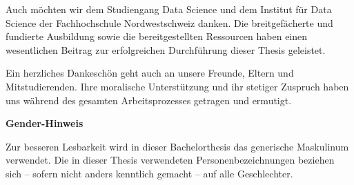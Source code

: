 Auch möchten wir dem Studiengang Data Science und dem Institut für Data Science der Fachhochschule Nordwestschweiz danken. Die breitgefächerte und fundierte Ausbildung sowie die bereitgestellten Ressourcen haben einen wesentlichen Beitrag zur erfolgreichen Durchführung dieser Thesis geleistet.

Ein herzliches Dankeschön geht auch an unsere Freunde, Eltern und Mitstudierenden. Ihre moralische Unterstützung und ihr stetiger Zuspruch haben uns während des gesamten Arbeitsprozesses getragen und ermutigt.

\vfill

\textbf{Gender-Hinweis}

Zur besseren Lesbarkeit wird in dieser Bachelorthesis das generische Maskulinum verwendet. Die in dieser Thesis verwendeten Personenbezeichnungen beziehen sich – sofern nicht anders kenntlich gemacht – auf alle Geschlechter.
